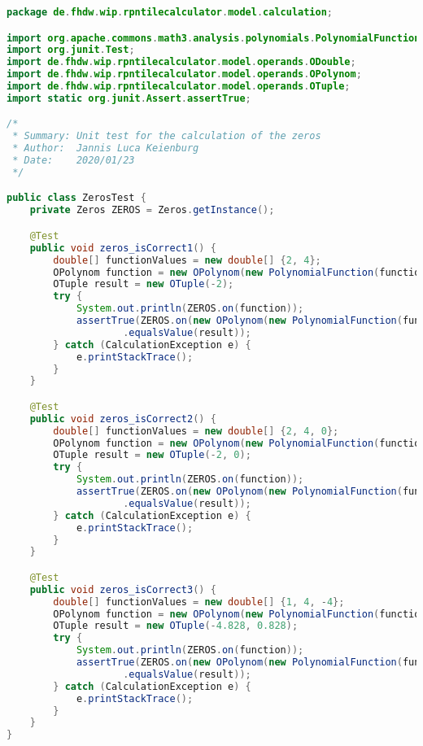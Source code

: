 \begin{lstlisting}[caption=ZerosTest (Keienburg),label=list:ZerosTest,language=Java]
package de.fhdw.wip.rpntilecalculator.model.calculation;

import org.apache.commons.math3.analysis.polynomials.PolynomialFunction;
import org.junit.Test;
import de.fhdw.wip.rpntilecalculator.model.operands.ODouble;
import de.fhdw.wip.rpntilecalculator.model.operands.OPolynom;
import de.fhdw.wip.rpntilecalculator.model.operands.OTuple;
import static org.junit.Assert.assertTrue;

/*
 * Summary: Unit test for the calculation of the zeros
 * Author:  Jannis Luca Keienburg
 * Date:    2020/01/23
 */

public class ZerosTest {
    private Zeros ZEROS = Zeros.getInstance();

    @Test
    public void zeros_isCorrect1() {
        double[] functionValues = new double[] {2, 4};
        OPolynom function = new OPolynom(new PolynomialFunction(functionValues));
        OTuple result = new OTuple(-2);
        try {
            System.out.println(ZEROS.on(function));
            assertTrue(ZEROS.on(new OPolynom(new PolynomialFunction(functionValues)))
                    .equalsValue(result));
        } catch (CalculationException e) {
            e.printStackTrace();
        }
    }

    @Test
    public void zeros_isCorrect2() {
        double[] functionValues = new double[] {2, 4, 0};
        OPolynom function = new OPolynom(new PolynomialFunction(functionValues));
        OTuple result = new OTuple(-2, 0);
        try {
            System.out.println(ZEROS.on(function));
            assertTrue(ZEROS.on(new OPolynom(new PolynomialFunction(functionValues)))
                    .equalsValue(result));
        } catch (CalculationException e) {
            e.printStackTrace();
        }
    }

    @Test
    public void zeros_isCorrect3() {
        double[] functionValues = new double[] {1, 4, -4};
        OPolynom function = new OPolynom(new PolynomialFunction(functionValues));
        OTuple result = new OTuple(-4.828, 0.828);
        try {
            System.out.println(ZEROS.on(function));
            assertTrue(ZEROS.on(new OPolynom(new PolynomialFunction(functionValues)))
                    .equalsValue(result));
        } catch (CalculationException e) {
            e.printStackTrace();
        }
    }
}
\end{lstlisting} 

